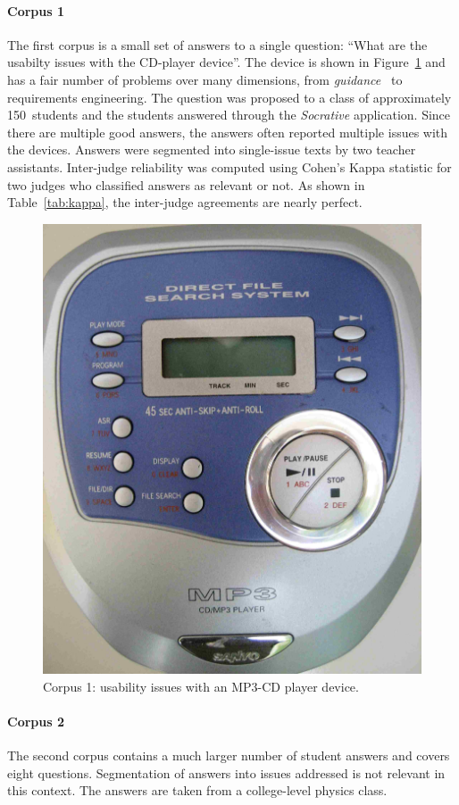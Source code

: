 \documentclass{edm_template}
\begin{document}
\paragraph{Corpus 1} The first corpus is a small set of answers to a single question: ``What are the usabilty issues with the CD-player device''.  The device is shown in Figure~\ref{tab:sanyo} and has a fair number of problems over many dimensions, from \textit{guidance}~\cite{scapin1997ergonomic} to requirements engineering.  The question was proposed to a class of approximately 150~students and the students answered through the \textit{Socrative} application.  Since there are multiple good answers, the answers often reported multiple issues with the devices.  Answers were segmented into single-issue texts by two teacher assistants.  Inter-judge reliability was computed using Cohen's Kappa statistic for two judges who classified answers as relevant or not. As shown in Table~\ref{tab:kappa}, the inter-judge agreements are nearly perfect.


\begin{figure}
  \centerline{\includegraphics[width=.75\columnwidth]{Images/sanyo-photo.jpg}}
  \caption{Corpus 1: usability issues with an MP3-CD player device.}
  \label{tab:sanyo}
\end{figure}

\paragraph{Corpus 2} The second corpus contains a much larger number of student answers and covers eight questions.  Segmentation of answers into issues addressed is not relevant in this context.  The answers are taken from a college-level physics class.
\end{document}
